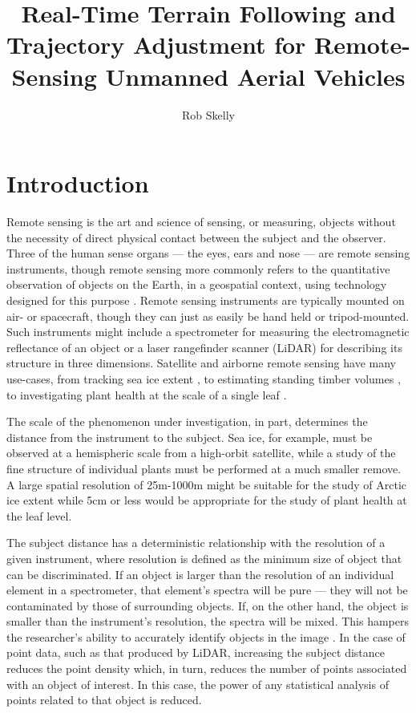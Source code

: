 \documentclass[10pt]{article}
\author{Rob Skelly}
\title{Real-Time Terrain Following and Trajectory Adjustment for Remote-Sensing Unmanned Aerial Vehicles}
\begin{document}
\maketitle

\doublespace

\section{Introduction}

Remote sensing is the art and science of sensing, or measuring, objects without the necessity of direct physical contact between the subject and the observer. Three of the human sense organs --- the eyes, ears and nose --- are remote sensing instruments, though remote sensing more commonly refers to the quantitative observation of objects on the Earth, in a geospatial context, using technology designed for this purpose \cite{Lillesand1999}. Remote sensing instruments are typically mounted on air- or spacecraft, though they can just as easily be hand held or tripod-mounted. Such instruments might include a spectrometer for measuring the electromagnetic reflectance of an object or a laser rangefinder scanner (LiDAR) for describing its structure in three dimensions. Satellite and airborne remote sensing have many use-cases, from tracking sea ice extent \cite{Dierking2006,Shuchman2004}, to estimating standing timber volumes \cite{Allouis2011,Tonolli2011}, to investigating plant health at the scale of a single leaf \cite{Palou2013}.

The scale of the phenomenon under investigation, in part, determines the distance from the instrument to the subject. Sea ice, for example, must be observed at a hemispheric scale from a high-orbit satellite, while a study of the fine structure of individual plants must be performed at a much smaller remove. A large spatial resolution of 25m-1000m \cite{Shuchman2004} might be suitable for the study of Arctic ice extent while 5cm or less \cite{Palou2013} would be appropriate for the study of plant health at the leaf level. 

The subject distance has a deterministic relationship with the resolution of a given instrument, where resolution is defined as the minimum size of object that can be discriminated. If an object is larger than the resolution of an individual element in a spectrometer, that element's spectra will be pure --- they will not be contaminated by those of surrounding objects. If, on the other hand, the object is smaller than the instrument's resolution, the spectra will be mixed. This hampers the researcher's ability to accurately identify objects in the image \cite{Lillesand1999}. In the case of point data, such as that produced by LiDAR, increasing the subject distance reduces the point density which, in turn, reduces the number of points associated with an object of interest. In this case, the power of any statistical analysis of points related to that object is reduced. 
\end{document}
